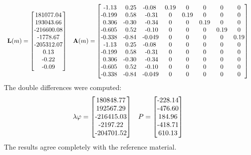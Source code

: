 \begin{equation}
	\begin{array}{cc}
		\mathbf{L}(m)= \left[\begin{matrix}
				$181077.04$ \\	
				$193043.66$	\\  	
				$-216600.08$\\  	
				$-1778.67$	\\   	
				$-205312.07$\\   	
				$0.13$		\\  	
				$-0.22$		\\  	
				$-0.09$		\\  	
			\end{matrix}\right] & 
			\mathbf{A}(m)= \left[\begin{matrix}
     $ -1.13$ & $ 0.25$ & $-0.08 $ & 0.19 &    0 &    0 &    0 &    0\\
     $-0.199$ & $ 0.58$ & $ -0.31$ &    0 & 0.19 &    0 &    0 &    0\\
     $ 0.306$ & $-0.30$ & $ -0.34$ &    0 &    0 & 0.19 &    0 &    0\\
     $-0.605$ & $ 0.52$ & $ -0.10$ &    0 &    0 &    0 & 0.19 &    0\\
     $-0.338$ & $-0.84$ & $-0.049$ &    0 &    0 &    0 &    0 & 0.19\\
     $ -1.13$ & $ 0.25$ & $-0.08 $ &    0 &    0 &    0 &    0 &    0\\
     $-0.199$ & $ 0.58$ & $ -0.31$ &    0 &    0 &    0 &    0 &    0\\
     $ 0.306$ & $-0.30$ & $ -0.34$ &    0 &    0 &    0 &    0 &    0\\
     $-0.605$ & $ 0.52$ & $ -0.10$ &    0 &    0 &    0 &    0 &    0\\
     $-0.338$ & $-0.84$ & $-0.049$ &    0 &    0 &    0 &    0 &    0\\
\end{matrix}\right]
	\end{array}
\end{equation} %
The double differences were computed:
\begin{equation}
	\begin{array}{cc}
		\lambda \varphi = 
		\left[\begin{matrix}
				$180848.77$ \\
				$192567.29$ \\
				$-216415.03$\\
				$-2197.22$\\
				$-204701.52$\\
		\end{matrix}\right]
		 &
		P =  
		\left[\begin{matrix}
			$-228.14$\\
			$-476.60$\\
			$184.96$\\
			$-418.71$\\
			$610.13$\\
		\end{matrix}\right]
	\end{array}
\end{equation}
The results agree completely with the reference material.

